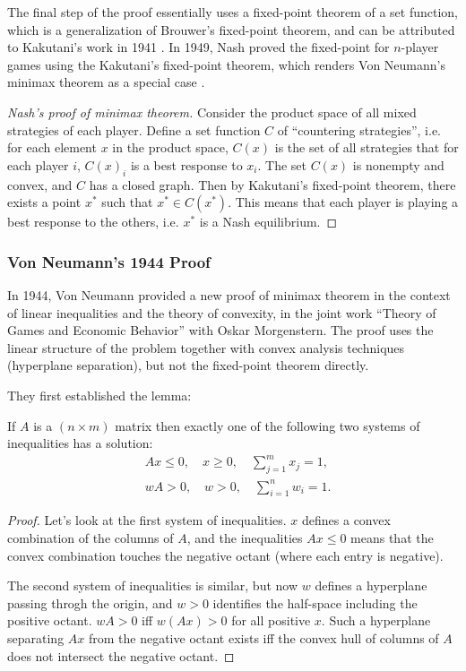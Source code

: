 The final step of the proof essentially uses a fixed-point theorem of a set function, which is a generalization of Brouwer's fixed-point theorem, and can be attributed to Kakutani's work in 1941 \autocite{kakutaniFixedPoint1941}. In 1949, Nash proved the fixed-point for $n$-player games using the Kakutani's fixed-point theorem, which renders Von Neumann's minimax theorem as a special case \autocite{nashEquilibrium1950}. 

\begin{proof}[Nash's proof of minimax theorem]
    Consider the product space of all mixed strategies of each player. Define a set function $C$ of ``countering strategies'', i.e. for each element $x$ in the product space, $C(x)$ is the set of all strategies that for each player $i$, $C(x)_i$ is a best response to $x_i$. The set $C(x)$ is nonempty and convex, and $C$ has a closed graph. Then by Kakutani's fixed-point theorem, there exists a point $x^*$ such that $x^* \in C(x^*)$. This means that each player is playing a best response to the others, i.e. $x^*$ is a Nash equilibrium. 
\end{proof}

\subsubsection{Von Neumann's 1944 Proof}
In 1944, Von Neumann provided a new proof of minimax theorem in the context of linear inequalities and the theory of convexity, in the joint work ``Theory of Games and Economic Behavior'' with Oskar Morgenstern. The proof uses the linear structure of the problem together with convex analysis techniques (hyperplane separation), but not the fixed-point theorem directly. 

They first established the lemma:

\begin{lemma}
    If $A$ is a $(n \times m)$  matrix then exactly one of the following two systems of inequalities has a solution:
\[
\begin{aligned}
& A x \leq 0, \quad x \geq 0, \quad \sum_{j=1}^m x_j=1, \\
& w A>0, \quad w>0, \quad \sum_{i=1}^n w_i=1 .
\end{aligned}
\]
\end{lemma}
\begin{proof}
    Let's look at the first system of inequalities. $x$ defines a convex combination of the columns of $A$, and the inequalities $Ax \leq 0$ means that the convex combination touches the negative octant (where each entry is negative). 

    The second system of inequalities is similar, but now $w$ defines a hyperplane passing throgh the origin, and $w > 0$ identifies the half-space including the positive octant. $w A > 0$ iff $w (Ax) > 0$ for all positive $x$. Such a hyperplane separating $Ax$ from the negative octant exists iff the convex hull of columns of $A$ does not intersect the negative octant.
\end{proof}

